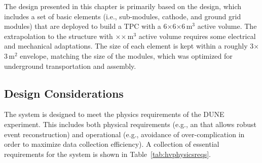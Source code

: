 The design presented in this chapter is primarily based on the  design, which includes a set of basic elements (i.e.,  sub-modules, cathode, and ground grid modules) that are deployed to build a TPC with a 6$\times$6$\times$6\,m$^3$ active volume. The extrapolation to the  structure with 
\tpcheight$\times$\dptpcwdth$\times$\dptpclen\,m$^3$ active volume %
requires some electrical and mechanical adaptations.  The size of each element is kept within a roughly 3$\times$3\,m$^2$ envelope, matching the size of the   modules, which was optimized for underground transportation and assembly.




\subsection{Design Considerations}
\label{sec:fddp-hv-des-consid}


The  system is designed to meet the physics requirements of the DUNE experiment. This includes both physical requirements (e.g., an \efield 
that allows robust event reconstruction) and operational (e.g., 
avoidance of over-complication in order to maximize data collection efficiency). 
A collection of essential requirements for the  system is shown in Table~\ref{tab:hvphysicsreqs}.

